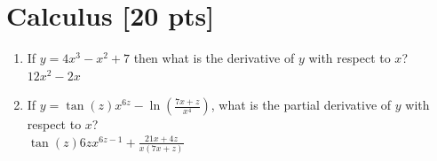 \documentclass[a4paper]{article}
\theoremstyle{definition}
\newenvironment{soln}{
    \leavevmode\color{blue}\ignorespaces
}{}
\begin{document}
\section{Calculus [20 pts]}
\begin{enumerate}
	\item 	If $y = 4x^3 - x^2 + 7$ then what is the derivative of $y$ with respect to $x$?\\
	\begin{soln}  $12x^2-2x$ \end{soln}
	\item If $y = \tan(z)x^{6z} - \ln(\frac{7x + z}{x^{4}})$, what is the partial derivative of $y$ with respect to $x$?\\
	\begin{soln}  $\tan(z)6zx^{6z-1}+\frac{21x+4z}{x(7x+z)}$ \end{soln}
\end{enumerate}
\end{document}
